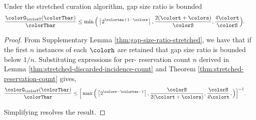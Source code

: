 \begin{theorem}
\label{thm:stretched-gap-size}
Under the stretched curation algorithm, gap size ratio is bounded
\begin{align*}
\frac{\colorG_{\colorT}(\colorTbar)}{\colorTbar}
&\leq
\min\Big(
  \left\lceil 2^{\colortau+1-\colors} \right\rceil,
  \frac{2(\colort + \colors)}{\colorS},
  \frac{4\colort}{\colorS}
\Big).
\end{align*}
\end{theorem}
\begin{proof}

From Supplementary Lemma \ref{thm:gap-size-ratio-stretched}, we have that if the first $n$ instances of each \hv{} $\colorh$ are retained that gap size ratio is bounded below $1/n$.
Substituting expressions for per-\hv{} reservation count $n$ derived in Lemma \ref{thm:stretched-discarded-incidence-count} and Theorem \ref{thm:stretched-reservation-count} gives,
\begin{align*}
  \frac{\colorG_{\colorT}(\colorTbar)}{\colorTbar}
  &\leq
  \Big[
    \max\Big(
      \left\lceil 2^{\colors - \colortau - 1} \right\rceil,
      \frac{\colorS}{2(\colort + \colors)},
      \frac{\colorS}{4\colort},
    \Big)
  \Big]^{-1}.
\end{align*}

Simplifying resolves the result.

\end{proof}
